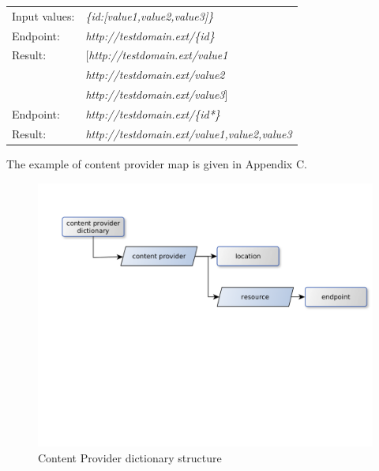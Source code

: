 
\begin{table}
	 \label{table:template_replacement}
	 \begin{center}
	  \begin{tabular}{l l}
	    Input values: & \textit{\{id:[value1,value2,value3]\}} \\
	    Endpoint: & \textit{http://testdomain.ext/\{id\}}  \\ 
	    Result: & [\textit{http://testdomain.ext/value1}   \\
	    		&  \textit{http://testdomain.ext/value2}   \\
	    		&  \textit{http://testdomain.ext/value3}]  \\
	    Endpoint: & \textit{http://testdomain.ext/\{id*\}} \\
	    Result: &  \textit{http://testdomain.ext/value1,value2,value3}
	  \end{tabular}
	\end{center}
\end{table}

The example of content provider map is given in Appendix C.


\begin{figure}[h]
    \centering
	\includegraphics[width=\textwidth]{images/content_provider_map.png}
    \caption{Content Provider dictionary structure}
    \label{fig:content_provider_map}
\end{figure}


